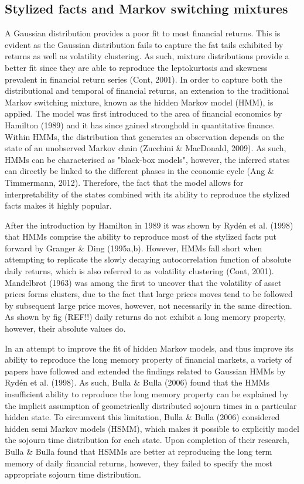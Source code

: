 \subsection{Stylized facts and Markov switching mixtures}
A Gaussian distribution provides a poor fit to most financial returns. This is evident as the Gaussian distribution fails to capture the fat tails exhibited by returns as well as volatility clustering. As such, mixture distributions provide a better fit since they are able to reproduce the leptokurtosis and skewness prevalent in financial return series (Cont, 2001). In order to capture both the distributional and temporal of financial returns, an extension to the traditional Markov switching mixture, known as the hidden Markov model (HMM), is applied. The model was first introduced to the area of financial economics by Hamilton (1989) and it has since gained stronghold in quantitative finance. Within HMMs, the distribution that generates an observation depends on the state of an unobserved Markov chain (Zucchini \& MacDonald, 2009). As such, HMMs can be characterised as "black-box models", however, the inferred states can directly be linked to the different phases in the economic cycle (Ang \& Timmermann, 2012). Therefore, the fact that the model allows for interpretability of the states combined with its ability to reproduce the stylized facts makes it highly popular. 

After the introduction by Hamilton in 1989 it was shown by Rydén et al. (1998) that HMMs comprise the ability to reproduce most of the stylized facts put forward by Granger \& Ding (1995a,b). However, HMMs fall short when attempting to replicate the slowly decaying autocorrelation function of absolute daily returns, which is also referred to as volatility clustering (Cont, 2001). Mandelbrot (1963) was among the first to uncover that the volatility of asset prices forms clusters, due to the fact that large prices moves tend to be followed by subsequent large price moves, however, not necessarily in the same direction. As shown by fig (REF!!) daily returns do not exhibit a long memory property, however, their absolute values do. 


In an attempt to improve the fit of hidden Markov models, and thus improve its ability to reproduce the long memory property of financial markets, a variety of papers have followed and extended the findings related to Gaussian HMMs by Rydén et al. (1998). As such, Bulla \& Bulla (2006) found that the HMMs insufficient ability to reproduce the long memory property can be explained by the implicit assumption of geometrically distributed sojourn times in a particular hidden state. To circumvent this limitation, Bulla \& Bulla (2006) considered hidden semi Markov models (HSMM), which makes it possible to explicitly model the sojourn time distribution for each state. Upon completion of their research, Bulla \& Bulla found that HSMMs are better at reproducing the long term memory of daily financial returns, however, they failed to specify the most appropriate sojourn time distribution. 

